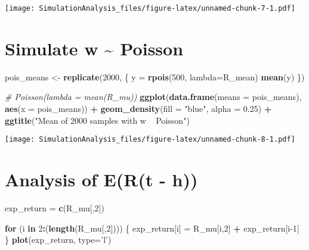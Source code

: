 \documentclass[
]{article}
\newenvironment{Shaded}{\begin{snugshade}}{\end{snugshade}}
\newcommand{\CommentTok}[1]{\textcolor[rgb]{0.56,0.35,0.01}{\textit{#1}}}
\newcommand{\ControlFlowTok}[1]{\textcolor[rgb]{0.13,0.29,0.53}{\textbf{#1}}}
\newcommand{\DataTypeTok}[1]{\textcolor[rgb]{0.13,0.29,0.53}{#1}}
\newcommand{\DecValTok}[1]{\textcolor[rgb]{0.00,0.00,0.81}{#1}}
\newcommand{\FloatTok}[1]{\textcolor[rgb]{0.00,0.00,0.81}{#1}}
\newcommand{\KeywordTok}[1]{\textcolor[rgb]{0.13,0.29,0.53}{\textbf{#1}}}
\newcommand{\NormalTok}[1]{#1}
\newcommand{\OperatorTok}[1]{\textcolor[rgb]{0.81,0.36,0.00}{\textbf{#1}}}
\newcommand{\StringTok}[1]{\textcolor[rgb]{0.31,0.60,0.02}{#1}}
\begin{document}
\texttt{[image: SimulationAnalysis\_files/figure-latex/unnamed-chunk-7-1.pdf]}

\hypertarget{simulate-w-poisson}{%
\section{Simulate w \textasciitilde{}
Poisson}\label{simulate-w-poisson}}

\begin{Shaded}
\begin{Highlighting}[]
\NormalTok{pois_means <-}\StringTok{ }\KeywordTok{replicate}\NormalTok{(}\DecValTok{2000}\NormalTok{, \{}
\NormalTok{  y =}\StringTok{ }\KeywordTok{rpois}\NormalTok{(}\DecValTok{500}\NormalTok{, }\DataTypeTok{lambda=}\NormalTok{R_mean)}
  \KeywordTok{mean}\NormalTok{(y)}
\NormalTok{\})}

\CommentTok{# Poisson(lambda = mean(R_mu))}
\KeywordTok{ggplot}\NormalTok{(}\KeywordTok{data.frame}\NormalTok{(}\DataTypeTok{means =}\NormalTok{ pois_means), }\KeywordTok{aes}\NormalTok{(}\DataTypeTok{x =}\NormalTok{ pois_means)) }\OperatorTok{+}\StringTok{ }\KeywordTok{geom_density}\NormalTok{(}\DataTypeTok{fill =} \StringTok{"blue"}\NormalTok{, }\DataTypeTok{alpha =} \FloatTok{0.25}\NormalTok{) }\OperatorTok{+}\StringTok{ }\KeywordTok{ggtitle}\NormalTok{(}\StringTok{"Mean of 2000 samples with w ~ Poisson"}\NormalTok{)}
\end{Highlighting}
\end{Shaded}

\texttt{[image: SimulationAnalysis\_files/figure-latex/unnamed-chunk-8-1.pdf]}

\hypertarget{analysis-of-ert---h}{%
\section{Analysis of E(R(t - h))}\label{analysis-of-ert---h}}

\begin{Shaded}
\begin{Highlighting}[]
\NormalTok{exp_return =}\StringTok{ }\KeywordTok{c}\NormalTok{(R_mu[,}\DecValTok{2}\NormalTok{])}

\ControlFlowTok{for}\NormalTok{ (i }\ControlFlowTok{in} \DecValTok{2}\OperatorTok{:}\NormalTok{(}\KeywordTok{length}\NormalTok{(R_mu[,}\DecValTok{2}\NormalTok{]))) \{}
\NormalTok{  exp_return[i] =}\StringTok{ }\NormalTok{R_mu[i,}\DecValTok{2}\NormalTok{] }\OperatorTok{+}\StringTok{ }\NormalTok{exp_return[i}\DecValTok{-1}\NormalTok{]}
\NormalTok{\}}
\KeywordTok{plot}\NormalTok{(exp_return, }\DataTypeTok{type=}\StringTok{'l'}\NormalTok{)}
\end{Highlighting}
\end{Shaded}
\end{document}
